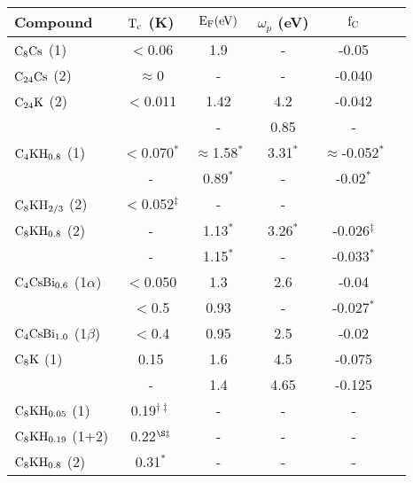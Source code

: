 {\newpage
\clearpage
\samepage \begin{table}%

\label{electronicparams}
\begin{center}
\begin{tabular}{|lc|cccc|}
\hline
Compound & $\rm T_c$ (K) & $\rm E_F (eV)$ &  $\omega_p$ (eV) & $\rm f_C$ \\ 
\hline
$\rm C_8Cs$ (1) & $<$0.06\cite{tanuma81} & 1.9\cite{lagues84}&-& -0.05\cite{takahashi86,dicenzo86}\\ 
$\rm C_{24}Cs$ (2) & $\approx$0 &-&-& -0.040\cite{fretigny85}\\ 
$\rm C_{24}K$ (2) & $<$0.011\cite{koike80} & 1.42\cite{doll87} & 4.2\cite{doll87} & -0.042\cite{doll87,I63,preil84}\\ 
& &-& 0.85\cite{preil84,preil83} &-& \\ 
$\rm C_4KH_{0.8}$  (1) & $<$0.070$^{\ast}$\cite{suzuki85b} &
$\approx$1.58$^{\ast}$\cite{doll87} & 3.31$^{\ast}$\cite{doll87} & $\approx$-0.052$^{\ast}$\cite{doll87}\\ 
&-& 0.89$^{\ast}$\cite{O353} & - & -0.02$^{\ast}$\cite{Z260}\\ 
$\rm C_8KH_{2/3}$ (2) & $<$0.052$^{\ddag}$\cite{sano80} & - & -  \\ 
$\rm C_8KH_{0.8}$ (2) & - & 1.13$^{\ast}$\cite{doll87} & 3.26$^{\ast}$\cite{doll87} & -0.026$^{\ddag}$\cite{doll87} \\ 
&-& 1.15$^{\ast}$\cite{Z260} &-& -0.033$^{\ast}$\cite{Z260}\\ 
$\rm C_4CsBi_{0.6}$ (1$\alpha$) & $<$0.050\cite{stang88} & 1.3\cite{yang88} & 2.6\cite{yang88} & -0.04\cite{yang88}\\ 
& $<$0.5\cite{E291} & 0.93\cite{E291} &-& -0.027$^*$\\ 
$\rm C_4CsBi_{1.0}$ (1$\beta$) & $<$0.4\cite{E291} & 0.95\cite{yang88} & 2.5\cite{yang88} & -0.02\cite{yang88}\\ 
$\rm C_8K$ (1) & 0.15\cite{kaneiwa82} & 1.6\cite{doll87} & 4.5\cite{doll87} & -0.075\cite{tanuma78}\\ 
&-& 1.4\cite{tanuma78} & 4.65\cite{fischer85} & -0.125\cite{preil84}\\ 
$\rm C_8KH_{0.05}$ (1) & 0.19$^{\dagger\ddag}$\cite{enoki85} & - & - & -\\ 
$\rm C_8KH_{0.19}$ (1+2) & 0.22$^{\S\ddag}$\cite{kaneiwa82} & - & - & -\\ 
$\rm C_8KH_{0.8}$ (2) & 0.31$^{\ast}$\cite{suzuki85b} & - & - & -\\ 

\end{tabular}
\end{center}
\end{table}}
